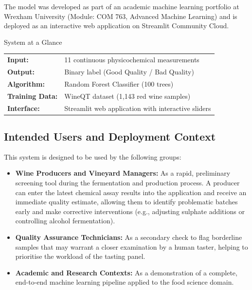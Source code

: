 \documentclass[11pt,a4paper]{article}
\begin{document}
The model was developed as part of an academic machine learning portfolio at Wrexham University (Module: COM 763, Advanced Machine Learning) and is deployed as an interactive web application on Streamlit Community Cloud.

\begin{infobox}{System at a Glance}
  \begin{tabular}{ll}
    \textbf{Input:}   & 11 continuous physicochemical measurements \\
    \textbf{Output:}  & Binary label (Good Quality / Bad Quality) \\
    \textbf{Algorithm:}  & Random Forest Classifier (100 trees) \\
    \textbf{Training Data:} & WineQT dataset (1,143 red wine samples) \\
    \textbf{Interface:}  & Streamlit web application with interactive sliders \\
  \end{tabular}
\end{infobox}

\subsection{Intended Users and Deployment Context}

This system is designed to be used by the following groups:

\begin{itemize}[leftmargin=*]
    \item \textbf{Wine Producers and Vineyard Managers:} As a rapid, preliminary screening tool during the fermentation and production process. A producer can enter the latest chemical assay results into the application and receive an immediate quality estimate, allowing them to identify problematic batches early and make corrective interventions (e.g., adjusting sulphate additions or controlling alcohol fermentation).

    \item \textbf{Quality Assurance Technicians:} As a secondary check to flag borderline samples that may warrant a closer examination by a human taster, helping to prioritise the workload of the tasting panel.

    \item \textbf{Academic and Research Contexts:} As a demonstration of a complete, end-to-end machine learning pipeline applied to the food science domain.
\end{itemize}
\end{document}
